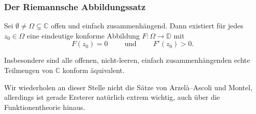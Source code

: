 \documentclass[10pt]{beamer}
\begin{document}
\begin{frame}
	\frametitle{Der Riemannsche Abbildungssatz}
	\pause
	\begin{theorem}[Riemann]
		Sei $\emptyset \neq \Omega \subsetneq \mathbb{C}$ offen und einfach zusammenhängend.
		Dann existiert für jedes $z_0 \in \Omega$ eine eindeutige konforme Abbildung $F \colon \Omega \to \mathbb{D}$ mit
		\[
			F(z_0) = 0 \qquad \text{ und } \qquad F'(z_0) > 0.
		\]
	\end{theorem}
	\pause
	Insbesondere sind alle offenen, nicht-leeren, einfach zusammenhängenden echte Teilmengen von $\mathbb{C}$ konform äquivalent.

	\pause
	Wir wiederholen an dieser Stelle nicht die Sätze von Arzelà–Ascoli und Montel, allerdings ist gerade Ersterer natürlich extrem wichtig, auch über die Funktionentheorie hinaus.
\end{frame}
\end{document}
